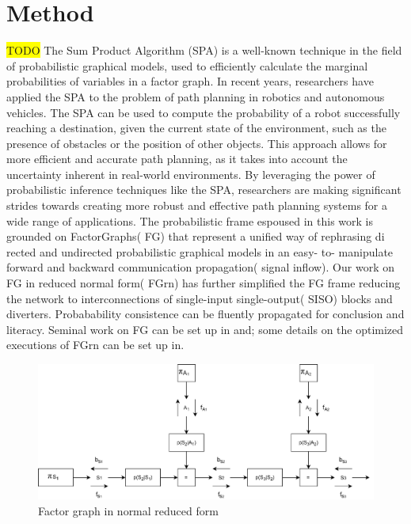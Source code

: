 \documentclass[journal,article,submit,pdftex,moreauthors]{Definitions/mdpi}
\begin{document}
\section{Method}
\colorbox{yellow}{TODO}
The Sum Product Algorithm (SPA) is a well-known technique in the field of probabilistic graphical models, used to efficiently calculate the marginal 
probabilities of variables in a factor graph. In recent years, researchers have applied the SPA to the problem of path planning in robotics and autonomous vehicles. 
The SPA can be used to compute the probability of a robot successfully reaching a destination, given the current state of the environment, such as the presence of obstacles or the 
position of other objects. This approach allows for more efficient and accurate path planning, as it takes into account the uncertainty inherent in real-world environments. 
By leveraging the power of probabilistic inference techniques like the SPA, researchers are making significant strides towards creating more robust and effective
 path planning systems for a wide range of applications.
The probabilistic frame espoused in this work is grounded on FactorGraphs( FG) that represent a unified way of rephrasing di rected and undirected probabilistic graphical models in an easy- to- manipulate forward and backward communication propagation( signal inflow). Our work on FG in reduced
normal form( FGrn) has further simplified the FG frame reducing
the network to interconnections of single-input single-output( SISO) blocks
and diverters. Probabability consistence can be fluently propagated for conclusion
and literacy. Seminal work on FG can be set up in and; some details
on the optimized executions of FGrn can be set up in. 

 \begin{figure}[H]
	\includegraphics[width=10.5 cm]{res/FGnr.png}
	\caption{Factor graph in normal reduced form}
\end{figure}
\end{document}
